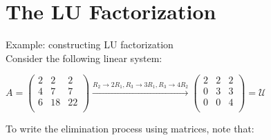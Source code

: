 \documentclass[UTF8,a4paper,11pt]{amsbook}
\begin{document}
\section{The LU Factorization}
Example: constructing LU factorization\\
Consider the following linear system:
\begin{center}
$A=
\begin{pmatrix}
2 & 2 & 2 \\
4 & 7 & 7 \\
6 & 18 & 22 \\
\end{pmatrix}
\xrightarrow[]{R_2\rightarrow 2R_1, R_3\rightarrow 3R_1, R_3\rightarrow 4R_2}
\begin{pmatrix}
2 & 2 & 2 \\
0 & 3 & 3 \\
0 & 0 & 4 \\
\end{pmatrix}=\mathcal{U}$
\end{center}
To write the elimination process using matrices, note that:
\end{document}
